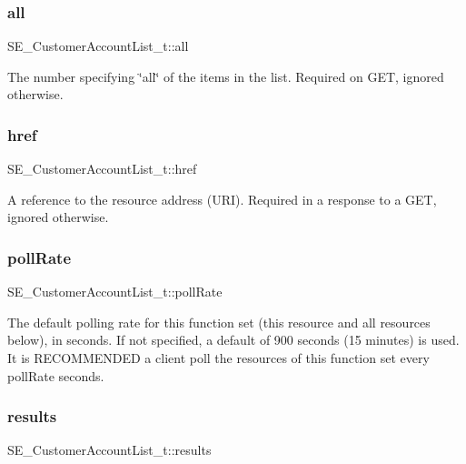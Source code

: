 \subsubsection{\texorpdfstring{all}{all}}
{\footnotesize\ttfamily S\+E\+\_\+\+Customer\+Account\+List\+\_\+t\+::all}

The number specifying \char`\"{}all\char`\"{} of the items in the list. Required on G\+ET, ignored otherwise. \mbox{\label{group__CustomerAccountList_ga779dd7f5cc9226f54bb2c7c42171888e}} 
\subsubsection{\texorpdfstring{href}{href}}
{\footnotesize\ttfamily S\+E\+\_\+\+Customer\+Account\+List\+\_\+t\+::href}

A reference to the resource address (U\+RI). Required in a response to a G\+ET, ignored otherwise. \mbox{\label{group__CustomerAccountList_ga1ecc993e58dc2d5bb1e4ce5cb31b54e0}} 
\subsubsection{\texorpdfstring{poll\+Rate}{pollRate}}
{\footnotesize\ttfamily S\+E\+\_\+\+Customer\+Account\+List\+\_\+t\+::poll\+Rate}

The default polling rate for this function set (this resource and all resources below), in seconds. If not specified, a default of 900 seconds (15 minutes) is used. It is R\+E\+C\+O\+M\+M\+E\+N\+D\+ED a client poll the resources of this function set every poll\+Rate seconds. \mbox{\label{group__CustomerAccountList_ga1e4789516b3787f1600934507472afe7}} 
\subsubsection{\texorpdfstring{results}{results}}
{\footnotesize\ttfamily S\+E\+\_\+\+Customer\+Account\+List\+\_\+t\+::results}

